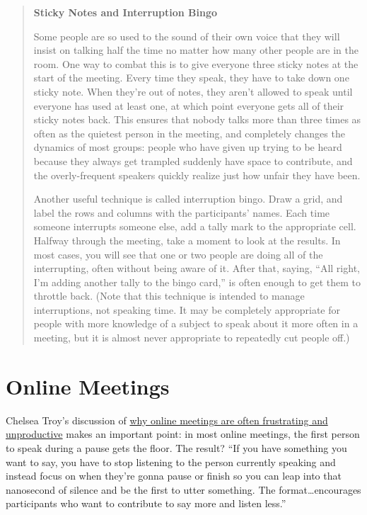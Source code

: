 \begin{quote}\setlength{\parindent}{0pt}
\textbf{Sticky Notes and Interruption Bingo}

Some people are so used to the sound of their own voice that they will
insist on talking half the time no matter how many other people are in
the room. One way to combat this is to give everyone three sticky
notes at the start of the meeting. Every time they speak, they have to
take down one sticky note. When they're out of notes, they aren't
allowed to speak until everyone has used at least one, at which point
everyone gets all of their sticky notes back. This ensures that nobody
talks more than three times as often as the quietest person in the
meeting, and completely changes the dynamics of most groups: people
who have given up trying to be heard because they always get trampled
suddenly have space to contribute, and the overly-frequent speakers
quickly realize just how unfair they have been.

Another useful technique is called interruption bingo. Draw a grid,
and label the rows and columns with the participants' names. Each time
someone interrupts someone else, add a tally mark to the appropriate
cell. Halfway through the meeting, take a moment to look at the
results. In most cases, you will see that one or two people are doing
all of the interrupting, often without being aware of it. After that,
saying, ``All right, I'm adding another tally to the bingo card,'' is
often enough to get them to throttle back. (Note that this technique
is intended to manage interruptions, not speaking time. It may be
completely appropriate for people with more knowledge of a subject to
speak about it more often in a meeting, but it is almost never
appropriate to repeatedly cut people off.)
\end{quote}

\section{Online Meetings}\label{online-meetings}

Chelsea Troy's discussion of \href{https://chelseatroy.com/2018/03/29/why-do-remote-meetings-suck-so-much/}{why online meetings are often
frustrating and unproductive} makes an important point:
in most online meetings, the first person to speak during a pause gets
the floor. The result? ``If you have something you want to say, you
have to stop listening to the person currently speaking and instead
focus on when they're gonna pause or finish so you can leap into that
nanosecond of silence and be the first to utter something. The
format\ldots{}encourages participants who want to contribute to say more
and listen less.''

